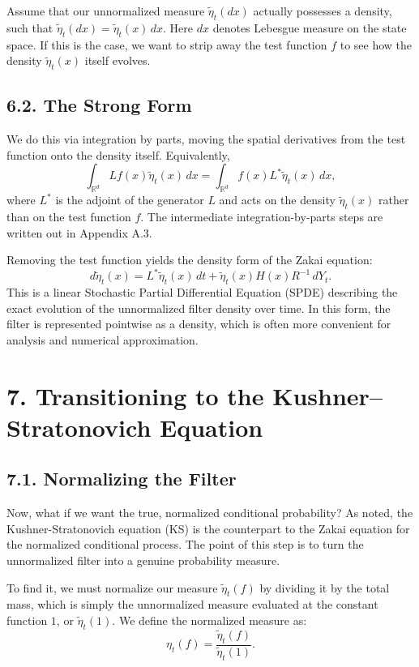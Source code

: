 \documentclass[11pt]{article}
\theoremstyle{definition}
\theoremstyle{remark}
\begin{document}
Assume that our unnormalized measure $\tilde \eta_t(dx)$ actually possesses a density, such that $\tilde \eta_t(dx)=\tilde \eta_t(x)\,dx$. Here $dx$ denotes Lebesgue measure on the state space. If this is the case, we want to strip away the test function $f$ to see how the density $\tilde \eta_t(x)$ itself evolves.

\subsection*{6.2. The Strong Form}
We do this via integration by parts, moving the spatial derivatives from the test function onto the density itself. Equivalently,
\[
\int_{\mathbb R^d} Lf(x)\tilde \eta_t(x)\,dx
=
\int_{\mathbb R^d} f(x)L^*\tilde \eta_t(x)\,dx,
\]
where $L^*$ is the adjoint of the generator $L$ and acts on the density $\tilde \eta_t(x)$ rather than on the test function $f$. The intermediate integration-by-parts steps are written out in Appendix A.3.

Removing the test function yields the density form of the Zakai equation:
\[
d\tilde \eta_t(x)=L^*\tilde \eta_t(x)\,dt+\tilde \eta_t(x)H(x)R^{-1}\,dY_t.
\]
This is a linear Stochastic Partial Differential Equation (SPDE) describing the exact evolution of the unnormalized filter density over time.
In this form, the filter is represented pointwise as a density, which is often more convenient for analysis and numerical approximation.

\section*{7. Transitioning to the Kushner--Stratonovich Equation}

\subsection*{7.1. Normalizing the Filter}
Now, what if we want the true, normalized conditional probability? As noted, the Kushner-Stratonovich equation (KS) is the counterpart to the Zakai equation for the normalized conditional process.
The point of this step is to turn the unnormalized filter into a genuine probability measure.

To find it, we must normalize our measure $\tilde \eta_t(f)$ by dividing it by the total mass, which is simply the unnormalized measure evaluated at the constant function $1$, or $\tilde \eta_t(1)$. We define the normalized measure as:
\[
\eta_t(f)=\frac{\tilde \eta_t(f)}{\tilde \eta_t(1)}.
\]
\end{document}

